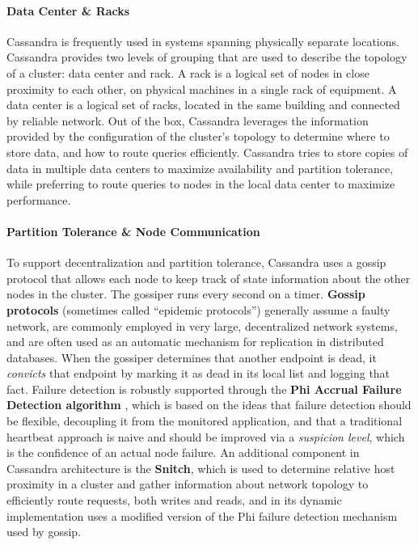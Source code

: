 \paragraph{Data Center \& Racks} Cassandra is frequently used in systems spanning physically separate locations. Cassandra provides two levels of grouping that are used to describe the topology of a cluster: data center and rack. A rack is a logical set of nodes in close proximity to each other, on physical machines in a single rack of equipment. A data center is a logical set of racks, located in the same building and connected by reliable network. Out of the box, Cassandra leverages the information provided by the configuration of the cluster’s topology to determine where to store data, and how to route queries efficiently. Cassandra tries to store copies of data in multiple data centers to maximize availability and partition tolerance, while preferring to route queries to nodes in the local data center to maximize performance.

\paragraph{Partition Tolerance \& Node Communication} To support decentralization and partition tolerance, Cassandra uses a gossip protocol that allows each node to keep track of state information about the other nodes in the cluster. The gossiper runs every second on a timer. \textbf{Gossip protocols} (sometimes called “epidemic protocols”) generally assume a faulty network, are commonly employed in very large, decentralized network systems, and are often used as an automatic mechanism for replication in distributed databases.
When the gossiper determines that another endpoint is dead, it \textit{convicts} that endpoint by marking it as dead in its local list and logging that fact.
Failure detection is robustly supported through the \textbf{Phi Accrual Failure Detection algorithm} \cite{hayashibara2004spl}, which is based on the ideas that failure detection should be flexible, decoupling it from the monitored application, and that a traditional heartbeat approach is naive and should be improved via a \textit{suspicion level}, which is the confidence of an actual node failure.
An additional component in Cassandra architecture is the \textbf{Snitch}, which is used to determine relative host proximity in a cluster and gather information about network topology to efficiently route requests, both writes and reads, and in its dynamic implementation uses a modified version of the Phi failure detection mechanism used by gossip.

